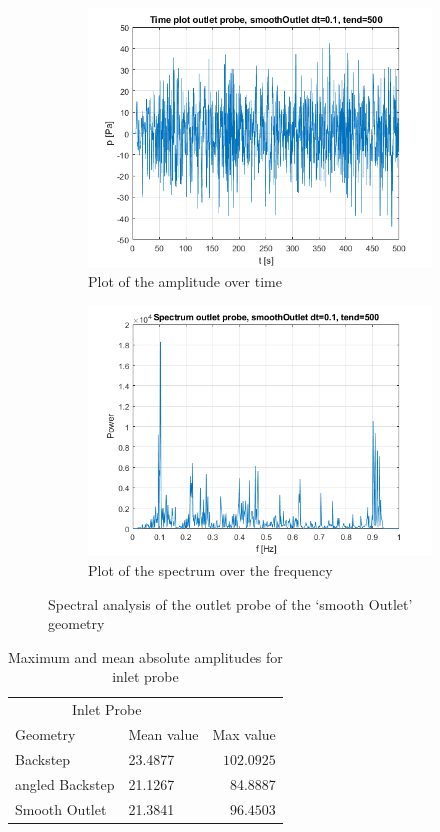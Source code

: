 \documentclass[fleqn,12pt]{NTFD} %
\begin{document}
\begin{figure}[H]
\centering
\begin{subfigure}{.5\textwidth}
  \centering
  \includegraphics[width=.8\linewidth]{smooth_time_outlet.png}
  \caption{Plot of the amplitude over time}
  \label{fig:sub1}
\end{subfigure}%
\begin{subfigure}{.5\textwidth}
  \centering
  \includegraphics[width=.8\linewidth]{smooth_spectrum_outlet.png}
  \caption{Plot of the spectrum over the frequency}
  \label{fig:sub2}
\end{subfigure}
\caption{Spectral analysis of the outlet probe of the `smooth Outlet' geometry}
\label{fig:test}
\end{figure}


\begin{table}[ht!]
\caption{Maximum and mean absolute amplitudes for inlet probe}
\centering
\begin{tabular}{llr}
\toprule
\multicolumn{2}{c}{Inlet Probe} \\
\cmidrule(r){1-2}
Geometry & Mean value & Max value \\
\midrule 
Backstep  & 23.4877 & $102.0925$ \\
angled Backstep & 21.1267 & 84.8887 \\
Smooth Outlet  & 21.3841 & $96.4503$ \\
\bottomrule
\end{tabular}
\label{tab:meanvalues inlet}
\end{table}
\end{document}
